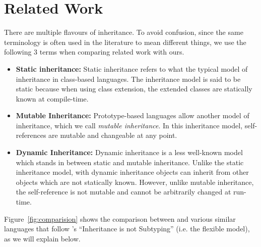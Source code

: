 \section{Related Work}
\label{sec:related}



There are multiple flavours of inheritance. To avoid confusion, since the same
terminology is often used in the literature to mean different things, we use the
following 3 terms when comparing related work with ours.

\begin{itemize}
\item{{\bf Static inheritance:}} Static inheritance refers to what the typical
  model of inheritance in class-based languages. The inheritance model is said
  to be static because when using class extension, the extended classes are
  statically known at compile-time.
\item{{\bf Mutable Inheritance:}} Prototype-based languages allow another model
  of inheritance, which we call \emph{mutable inheritance}. In this inheritance
  model, self-references are mutable and changeable at any point.
\item{{\bf Dynamic Inheritance:}} Dynamic inheritance is a less well-known model
  which stands in between static and mutable inheritance. Unlike the static
  inheritance model, with dynamic inheritance objects can inherit from other
  objects which are not statically known. However, unlike mutable inheritance,
  the self-reference is not mutable and cannot be arbitrarily changed at
  run-time.
\end{itemize}

Figure~\ref{fig:comparision} shows the comparison between \name and various
similar languages that follow \citeauthor{cook1989inheritance}'s ``Inheritance is not
Subtyping'' (i.e. the flexible model), as we will explain below.

